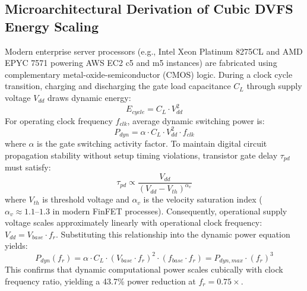 \documentclass[default,sn-mathphys-num]{sn-jnl}
\theoremstyle{thmstyleone}
\theoremstyle{thmstyletwo}
\theoremstyle{thmstylethree}
\begin{document}
\subsection{Microarchitectural Derivation of Cubic DVFS Energy Scaling}\label{sec:dvfs_derivation}
Modern enterprise server processors (e.g., Intel Xeon Platinum 8275CL and AMD EPYC 7571 powering AWS EC2 c5 and m5 instances) are fabricated using complementary metal-oxide-semiconductor (CMOS) logic. During a clock cycle transition, charging and discharging the gate load capacitance $C_L$ through supply voltage $V_{dd}$ draws dynamic energy:
\begin{equation}
E_{cycle} = C_L \cdot V_{dd}^2
\end{equation}
For operating clock frequency $f_{clk}$, average dynamic switching power is:
\begin{equation}
P_{dyn} = \alpha \cdot C_L \cdot V_{dd}^2 \cdot f_{clk}
\end{equation}
where $\alpha$ is the gate switching activity factor. To maintain digital circuit propagation stability without setup timing violations, transistor gate delay $\tau_{pd}$ must satisfy:
\begin{equation}
\tau_{pd} \propto \frac{V_{dd}}{(V_{dd} - V_{th})^{\alpha_v}}
\end{equation}
where $V_{th}$ is threshold voltage and $\alpha_v$ is the velocity saturation index ($\alpha_v \approx 1.1\text{--}1.3$ in modern FinFET processes). Consequently, operational supply voltage scales approximately linearly with operational clock frequency: $V_{dd} = V_{base} \cdot f_r$. Substituting this relationship into the dynamic power equation yields:
\begin{equation}
P_{dyn}(f_r) = \alpha \cdot C_L \cdot (V_{base} \cdot f_r)^2 \cdot (f_{base} \cdot f_r) = P_{dyn, max} \cdot (f_r)^3
\end{equation}
This confirms that dynamic computational power scales cubically with clock frequency ratio, yielding a 43.7\% power reduction at $f_r = 0.75\times$.
\end{document}
